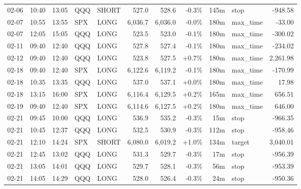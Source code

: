 \documentclass[11pt,a4paper,twoside]{article}
\begin{document}
\begin{center}
\begin{longtable}{>{\color{txtmain}}l l l l l r r r r >{\color{txtmain}}l r}
02-06 & 10:40 & 13:05 & QQQ & SHORT & 527.0 & 528.6 & \textcolor{lossred}{-0.3\%} & 145m & stop & \textcolor{lossred}{-948.58} \\
02-07 & 10:55 & 13:55 & SPX & LONG & 6,036.7 & 6,036.0 & \textcolor{lossred}{-0.0\%} & 180m & max\_time & \textcolor{lossred}{-33.00} \\
02-07 & 12:05 & 15:05 & QQQ & LONG & 523.5 & 523.0 & \textcolor{lossred}{-0.1\%} & 180m & max\_time & \textcolor{lossred}{-300.02} \\
02-11 & 09:40 & 12:40 & QQQ & LONG & 527.8 & 527.4 & \textcolor{lossred}{-0.1\%} & 180m & max\_time & \textcolor{lossred}{-234.02} \\
02-12 & 09:40 & 12:40 & QQQ & LONG & 523.8 & 527.5 & \textcolor{wingreen}{+0.7\%} & 180m & max\_time & \textcolor{wingreen}{2,261.98} \\
02-18 & 09:40 & 12:40 & SPX & LONG & 6,122.6 & 6,119.2 & \textcolor{lossred}{-0.1\%} & 180m & max\_time & \textcolor{lossred}{-170.99} \\
02-18 & 10:35 & 13:35 & QQQ & LONG & 537.0 & 537.1 & \textcolor{wingreen}{+0.0\%} & 180m & max\_time & \textcolor{wingreen}{17.98} \\
02-18 & 13:15 & 16:00 & SPX & LONG & 6,116.4 & 6,129.5 & \textcolor{wingreen}{+0.2\%} & 165m & max\_time & \textcolor{wingreen}{656.51} \\
02-19 & 09:40 & 12:40 & SPX & LONG & 6,114.6 & 6,127.5 & \textcolor{wingreen}{+0.2\%} & 180m & max\_time & \textcolor{wingreen}{646.00} \\
02-21 & 09:45 & 10:00 & QQQ & LONG & 536.9 & 535.2 & \textcolor{lossred}{-0.3\%} & 15m & stop & \textcolor{lossred}{-966.35} \\
02-21 & 10:45 & 12:37 & QQQ & LONG & 532.5 & 530.9 & \textcolor{lossred}{-0.3\%} & 112m & stop & \textcolor{lossred}{-958.46} \\
02-21 & 12:10 & 14:24 & SPX & SHORT & 6,080.0 & 6,019.2 & \textcolor{wingreen}{+1.0\%} & 134m & target & \textcolor{wingreen}{3,040.01} \\
02-21 & 12:45 & 13:02 & QQQ & LONG & 531.3 & 529.7 & \textcolor{lossred}{-0.3\%} & 17m & stop & \textcolor{lossred}{-956.39} \\
02-21 & 13:05 & 14:01 & QQQ & LONG & 529.7 & 528.1 & \textcolor{lossred}{-0.3\%} & 56m & stop & \textcolor{lossred}{-953.39} \\
02-21 & 14:05 & 14:29 & QQQ & LONG & 528.0 & 526.4 & \textcolor{lossred}{-0.3\%} & 24m & stop & \textcolor{lossred}{-950.36} \\

\end{longtable}
\end{center}
\end{document}
